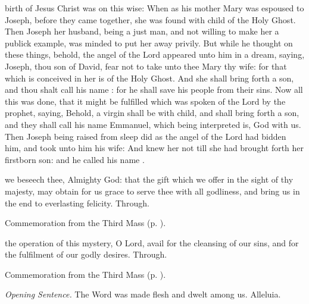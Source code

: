  birth of Jesus Christ was on this wise: When as his mother Mary was espoused to Joseph, before they came together, she was found with child of the Holy Ghost. Then Joseph her husband, being a just man, and not willing to make her a publick example, was minded to put her away privily. But while he thought on these things, behold, the angel of the Lord appeared unto him in a dream, saying, Joseph, thou son of David, fear not to take unto thee Mary thy wife: for that which is conceived in her is of the Holy Ghost. And she shall bring forth a son, and thou shalt call his name : for he shall save his people from their sins. Now all this was done, that it might be fulfilled which was spoken of the Lord by the prophet, saying, Behold, a virgin shall be with child, and shall bring forth a son, and they shall call his name Emmanuel, which being interpreted is, God with us. Then Joseph being raised from sleep did as the angel of the Lord had bidden him, and took unto him his wife: And knew her not till she had brought forth her firstborn son: and he called his name .


\secret
{} we beseech thee, Almighty God: that the gift which we offer in the sight of thy majesty, may obtain for us grace to serve thee with all godliness, and bring us in the end to everlasting felicity. Through.
\begin{rubric}
    Commemoration  from the Third Mass (p. \pageref{NativityMassIIISecret}).
\end{rubric}


\postcommunion
{} the operation of this mystery, O Lord, avail for the cleansing of our sins, and for the fulfilment of our godly desires. Through.


\begin{rubric}
    Commemoration  from the Third Mass (p. \pageref{NativityMassIIIPostcommunion}).
\end{rubric}


\par\noindent
\textit{Opening Sentence.} The Word was made flesh and dwelt among us. Alleluia.

